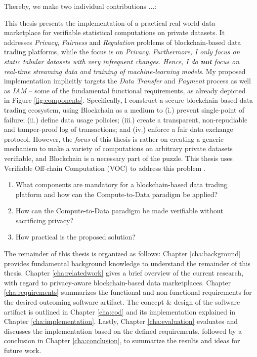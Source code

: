 Thereby, we make two individual contributions ...:

This thesis presents the implementation of a practical real world data marketplace for verifiable statistical computations on private datasets. It addresses \emph{Privacy}, \emph{Fairness} and \emph{Regulation} problems of blockchain-based data trading platforms, while the focus is on \emph{Privacy}. \emph{Furthermore, I only focus on static tabular datasets with very infrequent changes. Hence, I do \textbf{not} focus on real-time streaming data and training of machine-learning models}. My proposed implementation implicitly targets the \emph{Data Transfer} and \emph{Payment} process as well as \emph{IAM} -- some of the fundamental functional requirements, as already depicted in Figure \ref{fig:components}. Specifically, I construct a secure blockchain-based data trading ecosystem, using Blockchain as a medium to (i.) prevent single-point of failure; (ii.) define data usage policies; (iii.) create a transparent, non-repudiable and tamper-proof log of transactions; and (iv.) enforce a fair data exchange protocol. However, the \emph{focus} of this thesis is rather on creating a generic mechanism to make a variety of computations on arbitrary private datasets verifiable, and Blockchain is a necessary part of the puzzle. This thesis uses Verifiable Off-chain Computation (VOC) to address this problem \cite{eberhardtOffchainingModelsApproaches2018,eberhardtBlockchainInsightsOffChaining2017}.

\begin{enumerate}
    \item What components are mandatory for a blockchain-based data trading platform and how can the Compute-to-Data paradigm be applied?
    \item How can the Compute-to-Data paradigm be made verifiable without sacrificing privacy?
    \item How practical is the proposed solution?
\end{enumerate}

The remainder of this thesis is organized as follows: Chapter \ref{cha:background} provides fundamental background knowledge to understand the remainder of this thesis. Chapter \ref{cha:relatedwork} gives a brief overview of the current research, with regard to privacy-aware blockchain-based data marketplaces. Chapter \ref{cha:requirements} summarizes the functional and non-functional requirements for the desired outcoming software artifact. The concept \& design of the software artifact is outlined in Chapter \ref{cha:cod} and its implementation explained in Chapter \ref{cha:implementation}. Lastly, Chapter \ref{cha:evaluation} evaluates and discusses the implementation based on the defined requirements, followed by a conclusion in Chapter \ref{cha:conclusion}, to summarize the results and ideas for future work.